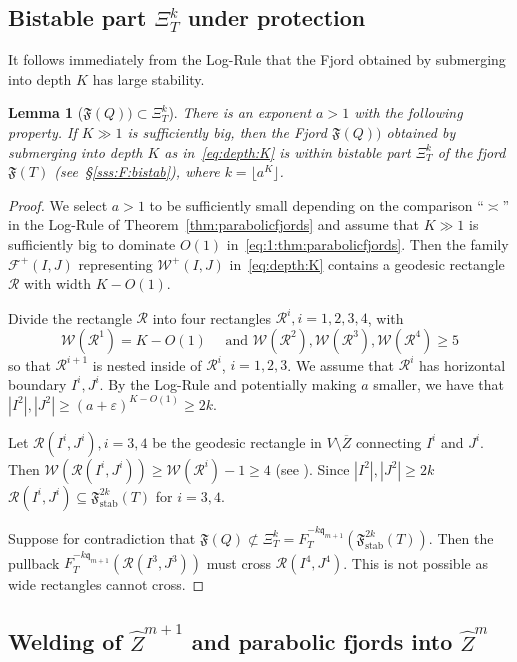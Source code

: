 \documentclass{amsart}
\newcommand{\1}{{\mathbb 1 }}
\newcommand{\Fam}{{\mathcal F}}
\newcommand{\Width}{{\mathcal W}}
\newcommand{\stab}{{\text{stab}}}
\newcommand\RR{\mathcal{R}}
\newcommand{\wZ}{{\widehat Z}}
\newcommand{\qq}{\mathfrak{q}}
\newtheorem{lem}[thm]{Lemma}
\theoremstyle{remark}
\numberwithin{equation}{section}
\theoremstyle{definition}
\newcommand{\Fjord}{{\mathfrak F}}
\begin{document}
 

\subsection{Bistable part $\Xi^k_T$ under protection}\label{ss:bistablepartunderprotection}
It follows immediately from the Log-Rule that the Fjord obtained by submerging into depth $K$ has large stability.
\begin{lem}[{$\mathfrak F(Q)) \subset \Xi^{k}_T$}]\label{lem:geodesicpseudoSiegel} There is an exponent $a>1$ with the following property. If $K\gg 1$ is sufficiently big, then the Fjord $\mathfrak F(Q))$ obtained by submerging into depth $K$ as in~\eqref{eq:depth:K} is within bistable part $\Xi^{k}_T$ of the fjord $\mathfrak F(T)$ (see~\S\ref{sss:F:bistab}), where $k=\lfloor a^K\rfloor$.
\end{lem}
\begin{proof}
We select $a>1$ to be sufficiently small depending on the comparison ``$\asymp$'' in the Log-Rule of Theorem~\ref{thm:parabolicfjords} and assume that $K\gg 1$ is sufficiently big to dominate $O(1)$ in~\eqref{eq:1:thm:parabolicfjords}. Then the family $\Fam^+(I,J)$ representing $\Width^+(I,J)$ in~\eqref{eq:depth:K} contains a geodesic rectangle $\RR$ with width $K-O(1)$. 


    Divide the rectangle $\RR$ into four rectangles $\RR^i, i = 1, 2, 3, 4$, with \[\Width(\RR^1)=K-O(1)\quad \text{ and }\Width(\RR^2), \Width(\RR^3), \Width(\RR^4)\ge 5\] so that $\RR^{i+1}$ is nested inside of $\RR^i$, $i = 1, 2, 3$. 
    We assume that $\RR^i$ has horizontal boundary $I^i, J^i$. By the Log-Rule and potentially making $a$ smaller, we have that $|I^2|,|J^2|\ge (a+\varepsilon)^{K-O(1)}\ge 2k$. 

    Let $\RR(I^i, J^i), i =3, 4$ be the geodesic rectangle in $V\setminus\overline{Z}$ connecting $I^i$ and $J^i$. Then $\Width(\RR(I^i, J^i)) \geq \Width(\RR^i) - 1 \geq 4$ (see \cite[Lemma A.5]{DL22}).
    Since $|I^2|,|J^2|\ge 2k$ $\RR(I^i, J^i) \subseteq \mathfrak F^{2k}_\stab(T)$ for $i=3, 4$.
    
    Suppose for contradiction that $\Fjord(Q) \not\subset \Xi^{k}_T = F^{-k\qq_{m+1}}_T(\mathfrak F^{2k}_\stab(T))$.
    Then the pullback $F^{-k\qq_{m+1}}_T(\RR(I^3, J^3))$ must cross $\RR(I^4, J^4)$. This is not possible as wide rectangles cannot cross.
\end{proof}



\subsection{Welding of $\wZ^{m+1}$ and parabolic fjords into $\wZ^m$}
\label{ss:WeildingLmm} 
\end{document}
